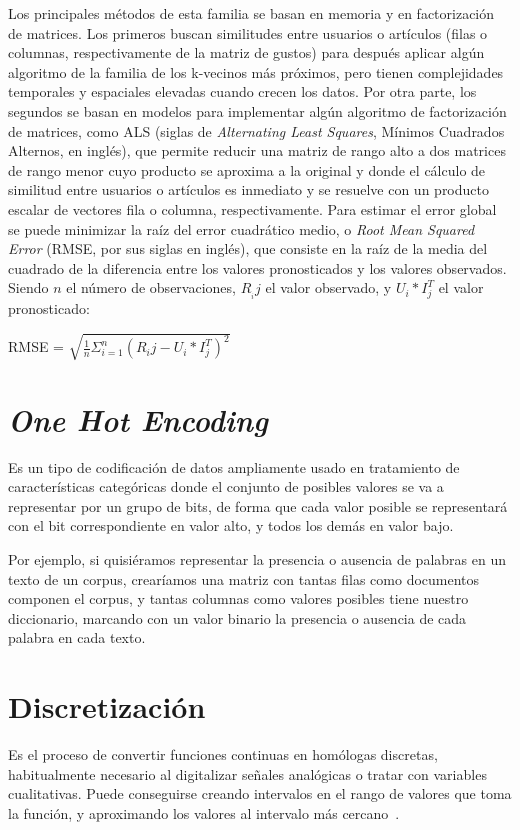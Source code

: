 Los principales métodos de esta familia se basan en memoria y en factorización de matrices. Los primeros buscan similitudes entre usuarios o artículos (filas o columnas, respectivamente de la matriz de gustos) para después aplicar algún algoritmo de la familia de los k-vecinos más próximos, pero tienen complejidades temporales y espaciales elevadas cuando crecen los datos. Por otra parte, los segundos se basan en modelos para implementar algún algoritmo de factorización de matrices, como ALS (siglas de \textit{Alternating Least Squares}, Mínimos Cuadrados Alternos, en inglés), que permite reducir una matriz de rango alto a dos matrices de rango menor cuyo producto se aproxima a la original y donde el cálculo de similitud entre usuarios o artículos es inmediato y se resuelve con un producto escalar de vectores fila o columna, respectivamente. Para estimar el error global se puede minimizar la raíz del error cuadrático medio, o \textit{Root Mean Squared Error} (RMSE, por sus siglas en inglés), que consiste en la raíz de la media del cuadrado de la diferencia entre los valores pronosticados y los valores observados. Siendo $n$ el número de observaciones, $R__ij$ el valor observado, y $U_i * I_j^T$ el valor pronosticado:

RMSE = $\sqrt{\frac{1}{n}\Sigma_{i=1}^{n}{(R_ij - U_i * I_j^T)}^2}$

\section{\textit{One Hot Encoding}}

Es un tipo de codificación de datos ampliamente usado en tratamiento de características categóricas donde el conjunto de posibles valores se va a representar por un grupo de bits, de forma que cada valor posible se representará con el bit correspondiente en valor alto, y todos los demás en valor bajo.

Por ejemplo, si quisiéramos representar la presencia o ausencia de palabras en un texto de un corpus, crearíamos una matriz con tantas filas como documentos componen el corpus, y tantas columnas como valores posibles tiene nuestro diccionario, marcando con un valor binario la presencia o ausencia de cada palabra en cada texto.

\section{Discretización}

Es el proceso de convertir funciones continuas en homólogas discretas, habitualmente necesario al digitalizar señales analógicas o tratar con variables cualitativas. Puede conseguirse creando intervalos en el rango de valores que toma la función, y aproximando los valores al intervalo más cercano~\cite{discretizacion}.

